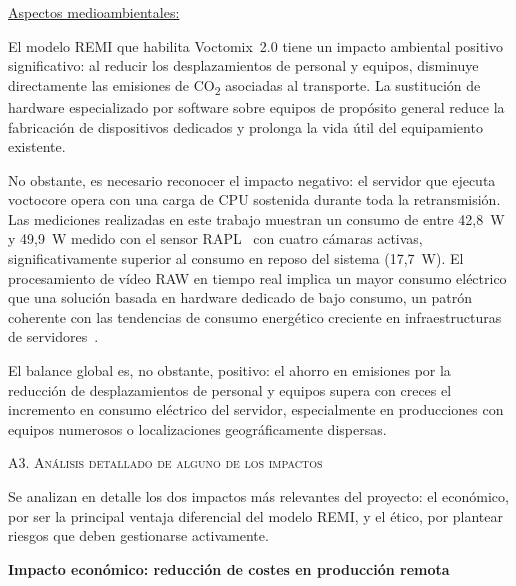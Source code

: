 \vspace{0.15cm}
\noindent\underline{Aspectos medioambientales:}
\normalsize{ El modelo REMI que habilita Voctomix~2.0 tiene un impacto ambiental positivo
significativo: al reducir los desplazamientos de personal y equipos, disminuye directamente las
emisiones de CO\textsubscript{2} asociadas al transporte. La sustitución de hardware especializado
por software sobre equipos de propósito general reduce la fabricación de dispositivos dedicados y
prolonga la vida útil del equipamiento existente.

No obstante, es necesario reconocer el impacto negativo: el servidor que ejecuta voctocore opera
con una carga de CPU sostenida durante toda la retransmisión. Las mediciones realizadas en este
trabajo muestran un consumo de entre 42,8~W y 49,9~W medido con el sensor RAPL~\cite{khan2018rapl}
con cuatro cámaras activas, significativamente superior al consumo en reposo del sistema (17,7~W).
El procesamiento de vídeo RAW en tiempo real implica un mayor consumo eléctrico que una solución
basada en hardware dedicado de bajo consumo, un patrón coherente con las tendencias de consumo
energético creciente en infraestructuras de servidores~\cite{iea_datacentres_2023}.

El balance global es, no obstante, positivo: el ahorro en emisiones por la reducción de
desplazamientos de personal y equipos supera con creces el incremento en consumo eléctrico del
servidor, especialmente en producciones con equipos numerosos o localizaciones geográficamente
dispersas.}
\vspace{0.3cm}

\Large{\textsc{\textcolor{nar}{A3. Análisis detallado de alguno de los impactos}}}
\vspace{0.2cm}

\normalsize{Se analizan en detalle los dos impactos más relevantes del proyecto: el económico,
por ser la principal ventaja diferencial del modelo REMI, y el ético, por plantear riesgos que
deben gestionarse activamente.}

\vspace{0.15cm}
\textbf{Impacto económico: reducción de costes en producción remota}

